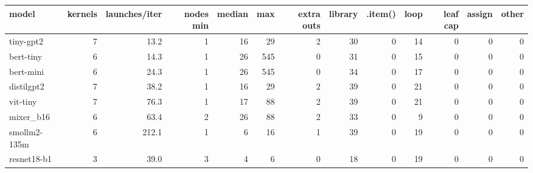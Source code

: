 \begin{tabular}{lrrrrrrrrrrrr}
\toprule
model & kernels & launches/iter & nodes min & median & max & extra outs & library & .item() & loop & leaf cap & assign & other \\
\midrule
tiny-gpt2 & 7 & 13.2 & 1 & 16 & 29 & 2 & 30 & 0 & 14 & 0 & 0 & 0 \\
bert-tiny & 6 & 14.3 & 1 & 26 & 545 & 0 & 31 & 0 & 15 & 0 & 0 & 0 \\
bert-mini & 6 & 24.3 & 1 & 26 & 545 & 0 & 34 & 0 & 17 & 0 & 0 & 0 \\
distilgpt2 & 7 & 38.2 & 1 & 16 & 29 & 2 & 39 & 0 & 21 & 0 & 0 & 0 \\
vit-tiny & 7 & 76.3 & 1 & 17 & 88 & 2 & 39 & 0 & 21 & 0 & 0 & 0 \\
mixer\_b16 & 6 & 63.4 & 2 & 26 & 88 & 2 & 33 & 0 & 9 & 0 & 0 & 0 \\
smollm2-135m & 6 & 212.1 & 1 & 6 & 16 & 1 & 39 & 0 & 19 & 0 & 0 & 0 \\
resnet18-b1 & 3 & 39.0 & 3 & 4 & 6 & 0 & 18 & 0 & 19 & 0 & 0 & 0 \\
\bottomrule
\end{tabular}
